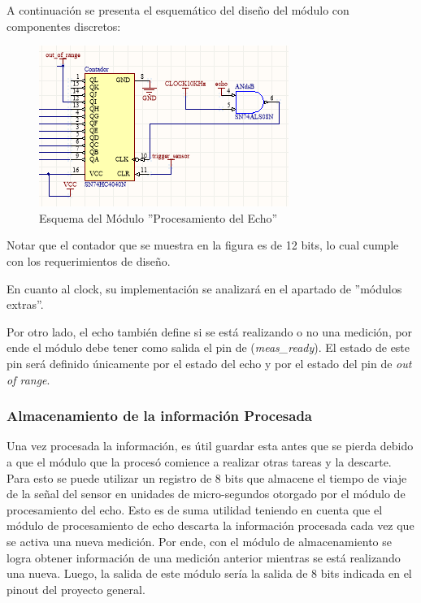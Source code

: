 A continuación se presenta el esquemático del diseño del módulo con
componentes discretos:

\begin{figure}[H]
\centering
\includegraphics[scale=0.7]{esquemaProcesamientoDeEcho.PNG}
\caption{Esquema del Módulo ''Procesamiento del Echo''}
\end{figure}

Notar que el contador que se muestra en la figura es de 12 bits, lo
cual cumple con los requerimientos de diseño.

En cuanto al clock, su implementación se analizará en el apartado
de ''módulos extras''.

Por otro lado, el echo también define si se está realizando o no una
medición, por ende el módulo debe tener como salida el pin de (\textit{meas\_ready}).
El estado de este pin será definido únicamente por el estado del echo
y por el estado del pin de \textit{out of range}.

\subsubsection{Almacenamiento de la información Procesada}

Una vez procesada la información, es útil guardar esta antes que se
pierda debido a que el módulo que la procesó comience a realizar otras
tareas y la descarte. Para esto se puede utilizar un registro de 8
bits que almacene el tiempo de viaje de la señal del sensor en unidades
de micro-segundos otorgado por el módulo de procesamiento del echo.
Esto es de suma utilidad teniendo en cuenta que el módulo de procesamiento
de echo descarta la información procesada cada vez que se activa una
nueva medición. Por ende, con el módulo de almacenamiento 
se logra obtener información de una medición anterior mientras se
está realizando una nueva. Luego, la salida de este módulo
sería la salida de 8 bits indicada en el pinout del proyecto general.\newline

